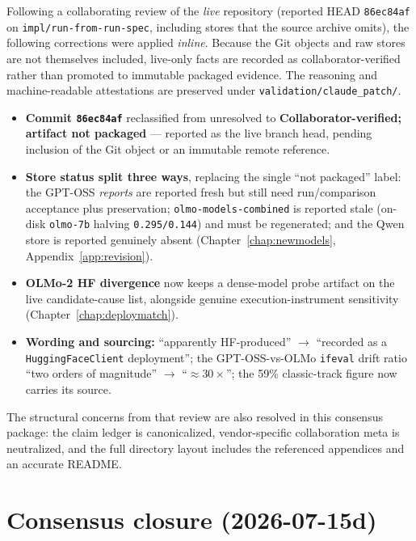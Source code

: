 \documentclass[11pt]{report}
\newcommand{\code}[1]{\texttt{#1}}
\newcommand{\file}[1]{\texttt{#1}}
\newcommand{\statusCollaboratorVerified}{\textbf{Collaborator-verified; artifact not packaged}}
\begin{document}
Following a collaborating review of the \emph{live} repository (reported HEAD
\code{86ec84af} on \code{impl/run-from-run-spec}, including  stores that
the source archive omits), the following corrections were applied \emph{inline}.
Because the Git objects and raw stores are not themselves included, live-only facts
are recorded as collaborator-verified rather than promoted to immutable packaged
evidence. The reasoning and machine-readable attestations are preserved under
\file{validation/claude\_patch/}.

\begin{itemize}[nosep]
  \item \textbf{Commit \code{86ec84af}} reclassified from unresolved to
        \statusCollaboratorVerified{} --- reported as the live branch head, pending
        inclusion of the Git object or an immutable remote reference.
  \item \textbf{Store status split three ways}, replacing the single ``not
        packaged'' label: the GPT-OSS \emph{reports} are reported fresh but still need
        run/comparison acceptance plus preservation; \code{olmo-models-combined} is
        reported stale (on-disk \code{olmo-7b} halving \code{0.295/0.144}) and must be
        regenerated; and the Qwen store is reported genuinely absent
        (Chapter~\ref{chap:newmodels}, Appendix~\ref{app:revision}).
  \item \textbf{OLMo-2 HF divergence} now keeps a dense-model probe artifact on the
        live candidate-cause list, alongside genuine execution-instrument sensitivity
        (Chapter~\ref{chap:deploymatch}).
  \item \textbf{Wording and sourcing:} ``apparently HF-produced'' $\rightarrow$
        ``recorded as a \code{HuggingFaceClient} deployment''; the GPT-OSS-vs-OLMo
        \code{ifeval} drift ratio ``two orders of magnitude'' $\rightarrow$
        ``$\approx\!30\times$''; the 59\% classic-track figure now carries its source.
\end{itemize}

\noindent The structural concerns from that review are also resolved in this
consensus package: the claim ledger is canonicalized, vendor-specific collaboration
meta is neutralized, and the full directory layout includes the referenced appendices
and an accurate README.

\section{Consensus closure (2026-07-15d)}
\label{sec:consensus-closed}
\end{document}
